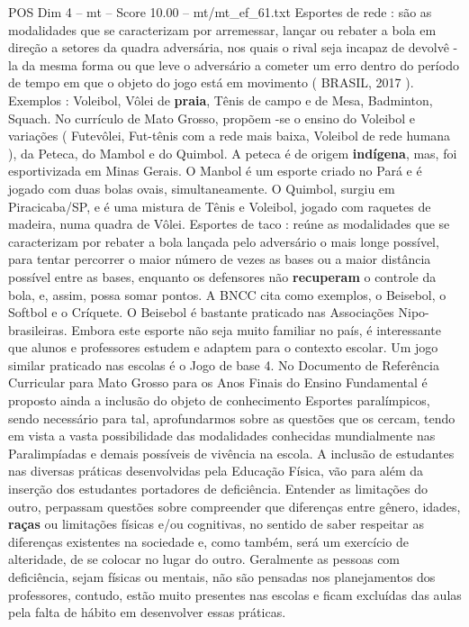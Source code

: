 \begin{textsample}{POS Dim 4 – mt – Score 10.00 – mt/mt\_ef\_61.txt}
Esportes de rede : são as modalidades que se caracterizam por arremessar, lançar ou rebater a bola em direção a setores da quadra adversária, nos quais o rival seja incapaz de devolvê -la da mesma forma ou que leve o adversário a cometer um erro dentro do período de tempo em que o objeto do jogo está em movimento ( BRASIL, 2017 ).
Exemplos : Voleibol, Vôlei de \textbf{praia}, Tênis de campo e de Mesa, Badminton, Squach.
No currículo de Mato Grosso, propõem -se o ensino do Voleibol e variações ( Futevôlei, Fut-tênis com a rede mais baixa, Voleibol de rede humana ), da Peteca, do Mambol e do Quimbol.
A peteca é de origem \textbf{indígena}, mas, foi esportivizada em Minas Gerais.
O Manbol é um esporte criado no Pará e é jogado com duas bolas ovais, simultaneamente.
O Quimbol, surgiu em Piracicaba/SP, e é uma mistura de Tênis e Voleibol, jogado com raquetes de madeira, numa quadra de Vôlei.
Esportes de taco : reúne as modalidades que se caracterizam por rebater a bola lançada pelo adversário o mais longe possível, para tentar percorrer o maior número de vezes as bases ou a maior distância possível entre as bases, enquanto os defensores não \textbf{recuperam} o controle da bola, e, assim, possa somar pontos.
A BNCC cita como exemplos, o Beisebol, o Softbol e o Críquete.
O Beisebol é bastante praticado nas Associações Nipo-brasileiras.
Embora este esporte não seja muito familiar no país, é interessante que alunos e professores estudem e adaptem para o contexto escolar.
Um jogo similar praticado nas escolas é o Jogo de base 4.
No Documento de Referência Curricular para Mato Grosso para os Anos Finais do Ensino Fundamental é proposto ainda a inclusão do objeto de conhecimento Esportes paralímpicos, sendo necessário para tal, aprofundarmos sobre as questões que os cercam, tendo em vista a vasta possibilidade das modalidades conhecidas mundialmente nas Paralimpíadas e demais possíveis de vivência na escola.
A inclusão de estudantes nas diversas práticas desenvolvidas pela Educação Física, vão para além da inserção dos estudantes portadores de deficiência.
Entender as limitações do outro, perpassam questões sobre compreender que diferenças entre gênero, idades, \textbf{raças} ou limitações físicas e/ou cognitivas, no sentido de saber respeitar as diferenças existentes na sociedade e, como também, será um exercício de alteridade, de se colocar no lugar do outro.
Geralmente as pessoas com deficiência, sejam físicas ou mentais, não são pensadas nos planejamentos dos professores, contudo, estão muito presentes nas escolas e ficam excluídas das aulas pela falta de hábito em desenvolver essas práticas.

\end{textsample}
